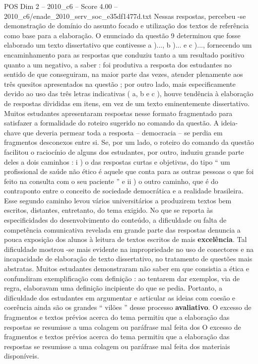 \begin{textsample}{POS Dim 2 – 2010\_c6 – Score 4.00 – 2010\_c6/enade\_2010\_serv\_soc\_e35df1477d.txt}
Nessas respostas, percebeu -se demonstração de domínio do assunto focado e utilização dos textos de referência como base para a elaboração.
O enunciado da questão 9 determinou que fosse elaborado um texto dissertativo que contivesse a )..., b )... e c )..., fornecendo um encaminhamento para as respostas que conduziu tanto a um resultado positivo quanto a um negativo, a saber : foi produtiva a resposta dos estudantes no sentido de que conseguiram, na maior parte das vezes, atender plenamente aos três quesitos apresentados na questão ; por outro lado, mais especificamente devido ao uso das três letras indicativas ( a, b e c ), houve tendência à elaboração de respostas divididas em itens, em vez de um texto eminentemente dissertativo.
Muitos estudantes apresentaram respostas nesse formato fragmentado para satisfazer a formalidade do roteiro sugerido no comando da questão.
A ideia-chave que deveria permear toda a resposta – democracia – se perdia em fragmentos desconexos entre si.
Se, por um lado, o roteiro do comando da questão facilitou o raciocínio de alguns dos estudantes, por outro, induziu grande parte deles a dois caminhos : i ) o das respostas curtas e objetivas, do tipo “ um profissional de saúde não ético é aquele que conta para as outras pessoas o que foi feito na consulta com o seu paciente ” e ii ) o outro caminho, que é do contraponto entre o conceito de sociedade democrática e a realidade brasileira.
Esse segundo caminho levou vários universitários a produzirem textos bem escritos, distantes, entretanto, do tema exigido.
No que se reporta às especificidades do desenvolvimento do conteúdo, a dificuldade ou falta de competência comunicativa revelada em grande parte das respostas denuncia a pouca exposição dos alunos à leitura de textos escritos de mais \textbf{excelência}.
Tal dificuldade mostrou -se mais evidente na impropriedade no uso de conectores e na incapacidade de elaboração de texto dissertativo, no tratamento de questões mais abstratas.
Muitos estudantes demonstraram não saber em que consistia a ética e confundiram exemplificação com definição : ao tentarem dar exemplos, via de regra, elaboravam uma definição incipiente do que se pedia.
Portanto, a dificuldade dos estudantes em argumentar e articular as ideias com coesão e coerência ainda são os grandes “ vilões ” desse processo \textbf{avaliativo}.
O excesso de fragmentos e textos prévios acerca do tema permitiu que a elaboração das respostas se resumisse a uma colagem ou paráfrase mal feita dos O excesso de fragmentos e textos prévios acerca do tema permitiu que a elaboração das respostas se resumisse a uma colagem ou paráfrase mal feita dos materiais disponíveis.

\end{textsample}
